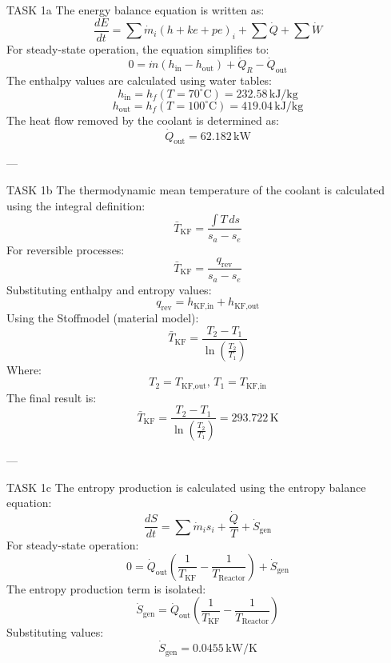 TASK 1a  
The energy balance equation is written as:  
\[
\frac{dE}{dt} = \sum \dot{m}_i \left( h + ke + pe \right)_i + \sum \dot{Q} + \sum \dot{W}
\]  
For steady-state operation, the equation simplifies to:  
\[
0 = \dot{m} \left( h_{\text{in}} - h_{\text{out}} \right) + \dot{Q}_R - \dot{Q}_{\text{out}}
\]  
The enthalpy values are calculated using water tables:  
\[
h_{\text{in}} = h_f(T = 70^\circ\text{C}) = 232.58 \, \text{kJ/kg}
\]  
\[
h_{\text{out}} = h_f(T = 100^\circ\text{C}) = 419.04 \, \text{kJ/kg}
\]  
The heat flow removed by the coolant is determined as:  
\[
\dot{Q}_{\text{out}} = 62.182 \, \text{kW}
\]  

---

TASK 1b  
The thermodynamic mean temperature of the coolant is calculated using the integral definition:  
\[
\bar{T}_{\text{KF}} = \frac{\int T \, ds}{s_a - s_e}
\]  
For reversible processes:  
\[
\bar{T}_{\text{KF}} = \frac{q_{\text{rev}}}{s_a - s_e}
\]  
Substituting enthalpy and entropy values:  
\[
q_{\text{rev}} = h_{\text{KF,in}} + h_{\text{KF,out}}
\]  
Using the Stoffmodel (material model):  
\[
\bar{T}_{\text{KF}} = \frac{T_2 - T_1}{\ln \left( \frac{T_2}{T_1} \right)}
\]  
Where:  
\[
T_2 = T_{\text{KF,out}}, \, T_1 = T_{\text{KF,in}}
\]  
The final result is:  
\[
\bar{T}_{\text{KF}} = \frac{T_2 - T_1}{\ln \left( \frac{T_2}{T_1} \right)} = 293.722 \, \text{K}
\]  

---

TASK 1c  
The entropy production is calculated using the entropy balance equation:  
\[
\frac{dS}{dt} = \sum \dot{m}_i s_i + \frac{\dot{Q}}{T} + \dot{S}_{\text{gen}}
\]  
For steady-state operation:  
\[
0 = \dot{Q}_{\text{out}} \left( \frac{1}{T_{\text{KF}}} - \frac{1}{T_{\text{Reactor}}} \right) + \dot{S}_{\text{gen}}
\]  
The entropy production term is isolated:  
\[
\dot{S}_{\text{gen}} = \dot{Q}_{\text{out}} \left( \frac{1}{T_{\text{KF}}} - \frac{1}{T_{\text{Reactor}}} \right)
\]  
Substituting values:  
\[
\dot{S}_{\text{gen}} = 0.0455 \, \text{kW/K}
\]